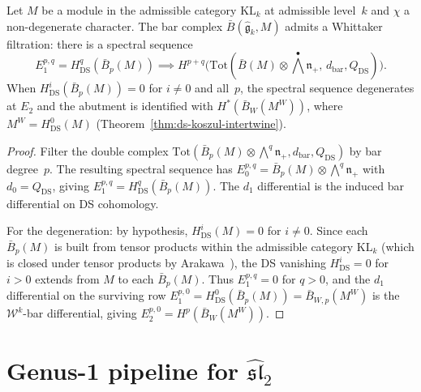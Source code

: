 \begin{proposition}
\label{prop:bar-whittaker}
Let $M$ be a module in the admissible category
$\mathrm{KL}_k$ at admissible level~$k$ and
$\chi$ a non-degenerate character.
The bar complex $\bar{B}(\widehat{\mathfrak{g}}_k, M)$
admits a Whittaker filtration: there is a spectral sequence
\begin{equation}\label{eq:whittaker-ss}
E_1^{p,q} = H^q_{\mathrm{DS}}(\bar{B}_p(M))
\implies H^{p+q}\bigl(\mathrm{Tot}(\bar{B}(M) \otimes
\textstyle\bigwedge^\bullet \mathfrak{n}_+,\,
d_{\mathrm{bar}}, Q_{\mathrm{DS}})\bigr).
\end{equation}
When $H^i_{\mathrm{DS}}(\bar{B}_p(M)) = 0$ for $i \neq 0$
and all~$p$, the spectral sequence degenerates at $E_2$
and the abutment is identified with $H^*(\bar{B}_W(M^W))$,
where $M^W = H^0_{\mathrm{DS}}(M)$
\textup{(}Theorem~\textup{\ref{thm:ds-koszul-intertwine})}.
\end{proposition}

\begin{proof}
Filter the double complex
$\mathrm{Tot}(\bar{B}_p(M) \otimes \bigwedge^q \mathfrak{n}_+,
d_{\mathrm{bar}}, Q_{\mathrm{DS}})$ by bar degree~$p$.
The resulting spectral sequence has $E_0^{p,q} =
\bar{B}_p(M) \otimes \bigwedge^q \mathfrak{n}_+$ with
$d_0 = Q_{\mathrm{DS}}$, giving $E_1^{p,q} =
H^q_{\mathrm{DS}}(\bar{B}_p(M))$.  The $d_1$ differential is
the induced bar differential on DS cohomology.

For the degeneration: by hypothesis,
$H^i_{\mathrm{DS}}(M) = 0$ for $i \neq 0$.  Since each
$\bar{B}_p(M)$ is built from tensor products within the
admissible category $\mathrm{KL}_k$ (which is closed under
tensor products by Arakawa~\cite{Arakawa17}),
the DS vanishing $H^i_{\mathrm{DS}} = 0$ for $i > 0$ extends
from $M$ to each $\bar{B}_p(M)$.  Thus $E_1^{p,q} = 0$ for
$q > 0$, and the $d_1$ differential on the surviving row
$E_1^{p,0} = H^0_{\mathrm{DS}}(\bar{B}_p(M)) = \bar{B}_{W,p}(M^W)$
is the $\mathcal{W}^k$-bar differential, giving
$E_2^{p,0} = H^p(\bar{B}_W(M^W))$.
\end{proof}

\section{\texorpdfstring{Genus-1 pipeline for $\widehat{\mathfrak{sl}}_2$}{Genus-1 pipeline for sl-2}}
\label{sec:sl2-genus-one-pipeline}

